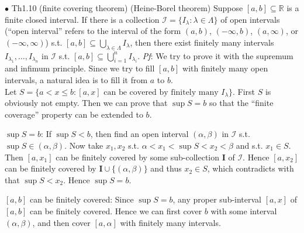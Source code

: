 \documentclass{article}
\begin{document}
\begin{Th}{$\bullet$ Th1.10 (finite covering theorem) (Heine-Borel theorem)}
    Suppose $[a,b]\subseteq\mathbb{R}$ is a finite closed interval. If there is a collection $\mathcal{I} = \{I_\lambda: \lambda\in\Lambda\}$ of open intervals (``open interval'' refers to the interval of the form $(a,b)$, $(-\infty, b)$, $(a, \infty)$, or $(-\infty, \infty)$) s.t. $[a,b]\subseteq\bigcup\limits_{\lambda\in\Lambda}I_\lambda$, then there exist finitely many intervals $I_{\lambda_1}, \dots, I_{\lambda_n}$ in $\mathcal{I}$ s.t. $[a,b]\subseteq\bigcup\limits_{i=1}^nI_{\lambda_i}$.
    \tcblower
    \textit{Pf}: We try to prove it with the supremum and infimum principle. Since we try to fill $[a,b]$ with finitely many open intervals, a natural idea is to fill it from $a$ to $b$. \\
    Let $S = \{a<x\leq b: [a,x] \text{ can be covered by finitely many } I_\lambda\}$. First $S$ is obviously not empty. Then we can prove that $\sup S = b$ so that the ``finite coverage'' property can be extended to $b$.
    \begin{compactenum}
        \item $\sup S = b$: If $\sup S < b$, then find an open interval $(\alpha, \beta)$ in $\mathcal{I}$ s.t. $\sup S\in (\alpha, \beta)$. Now take $x_1, x_2$ s.t. $\alpha<x_1<\sup S<x_2<\beta$ and s.t. $x_1\in S$. Then $[a, x_1]$ can be finitely covered by some sub-collection $\pmb{I}$ of $\mathcal{I}$. Hence $[a, x_2]$ can be finitely covered by $\pmb{I}\cup\{(\alpha, \beta)\}$ and thus $x_2\in S$, which contradicts with that $\sup S<x_2$. Hence $\sup S = b$.
        \item $[a,b]$ can be finitely covered: Since $\sup S = b$, any proper sub-interval $[a,x]$ of $[a,b]$ can be finitely covered. Hence we can first cover $b$ with some interval $(\alpha, \beta)$, and then cover $[a, \alpha]$ with finitely many intervals. 
    \end{compactenum}
\end{Th}
\end{document}
